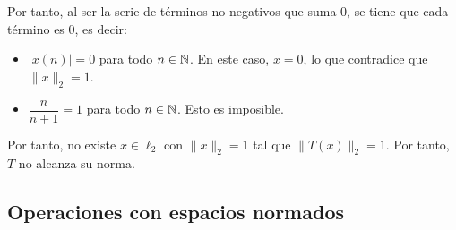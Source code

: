 \begin{ejercicio}
    Por tanto, al ser la serie de términos no negativos que suma $0$, se tiene que cada término es $0$, es decir:
    \begin{itemize}
        \item $|x(n)| = 0$ para todo $n \in \mathbb{N}$. En este caso, $x = 0$, lo que contradice que $\|x\|_2 = 1$.
        \item $\dfrac{n}{n+1} = 1$ para todo $n \in \mathbb{N}$. Esto es imposible.
    \end{itemize}

    Por tanto, no existe $x \in \ell_2$ con $\|x\|_2 = 1$ tal que $\|T(x)\|_2 = 1$. Por tanto, $T$ no alcanza su norma.
\end{ejercicio}


\newpage\subsection{Operaciones con espacios normados}


